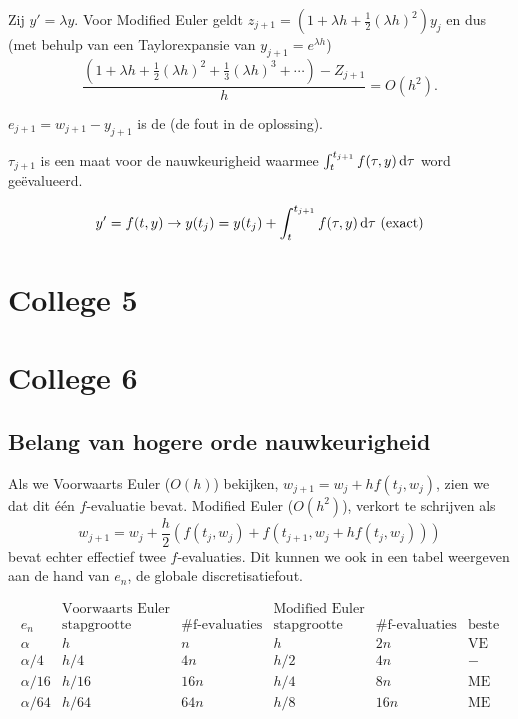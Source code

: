 \documentclass{2wn20summary}
\begin{document}
			\begin{voorbeeld}
				Zij $y'=\lambda y$.
				Voor Modified Euler geldt $ z_{j+1} = (1+\lambda h + \frac{1}{2} (\lambda h)^2)y_j $ en dus (met behulp van een Taylorexpansie van $y_{j+1}=e^{\lambda h}$)
				\[
					\frac{(1+\lambda h + \frac{1}{2}(\lambda h)^2 + \frac{1}{3}(\lambda h)^3+\dotsm) - Z_{j+1}}{h} = O(h^2).
				 \]
			\end{voorbeeld}

			\begin{define}

				$e_{j+1}=w_{j+1}-y_{j+1}$ is de  (de fout in de oplossing).
			\end{define}
			$\tau_{j+1}$ is een maat voor de nauwkeurigheid waarmee $\int_t^{t_{j+1}} f(\tau,y) \mathop{}\!\mathrm{d} \tau$ word ge\"evalueerd.

			\[
				y'=f(t,y) \to y(t_j) = y(t_j) + \int_t^{t_{j+1}} f(\tau,y) \mathop{}\!\mathrm{d} \tau \text{ (exact)}
			 \] %






	\section{College 5}

	\section{College 6}
	
	\subsection{Belang van hogere orde nauwkeurigheid}
	
		Als we Voorwaarts Euler ($O(h)$) bekijken, $w_{j+1} = w_j + hf(t_j,w_j)$, zien we dat dit \'e\'en $f$-evaluatie bevat. Modified Euler ($O(h^2)$), verkort te schrijven als
		\[ 
			w_{j+1} = w_j + \frac{h}{2} (f(t_j,w_j) + f(t_{j+1},w_j + hf(t_j,w_j)))
		 \]
		 bevat echter effectief twee $f$-evaluaties. Dit kunnen we ook in een tabel weergeven aan de hand van $e_n$, de globale discretisatiefout.
		 
		 \[ 
			 \begin{array}{c|cc|cc|c}
				 & \text {Voorwaarts Euler} & & \text {Modified Euler} & & \\
				 e_n & \text {stapgrootte} & \text {\#f-evaluaties} & \text {stapgrootte} & \text {\#f-evaluaties} & \text {beste} \\
				 \hline
				 \alpha & h &n &h &2n & \text {VE} \\
				 \alpha /4 & h/4 & 4n & h/2 & 4n & - \\
				 \alpha /16 & h/16 & 16n & h/4 & 8n & \text {ME} \\
				 \alpha /64 & h/64 & 64n & h/8 & 16n & \text {ME}
			 \end{array}
		  \]
		  
\end{document}
